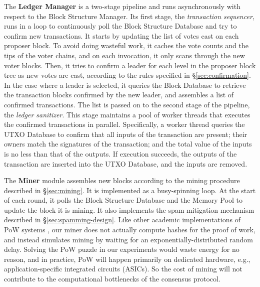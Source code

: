The \textbf{Ledger Manager} is a two-stage pipeline and runs asynchronously with respect to the Block Structure Manager. Its first stage, the \textit{transaction sequencer}, runs in a loop to continuously poll the Block Structure Database and try to confirm new transactions. It starts by updating the list of votes cast on each proposer block. To avoid doing wasteful work, it caches the vote counts and the tips of the voter chains, and on each invocation, it only scans through the new voter blocks. Then, it tries to confirm a leader for each level in the proposer block tree as new votes are cast, according to the rules specified in \S\ref{sec:confirmation}. In the case where a leader is selected, it queries the Block Database to retrieve the transaction blocks confirmed by the new leader, and assembles a list of confirmed transactions. The list is passed on to the second stage of the pipeline, the \textit{ledger sanitizer}. This stage maintains a pool of worker threads that executes the confirmed transactions in parallel. Specifically, a worker thread queries the UTXO Database to confirm that all inputs of the transaction are present; their owners match the signatures of the transaction;
and the total value of the inputs is no less than that of the outputs. If execution succeeds, the outputs of the transaction are inserted into the UTXO Database, and the inputs are removed.

The \textbf{Miner} module assembles new blocks according to the mining procedure described in \S\ref{sec:mining}. It is implemented as a busy-spinning loop. At the start of each round, it polls the Block Structure Database and the Memory Pool to update the block it is mining. It also implements the spam mitigation mechanism described in \S\ref{sec:spamming-design}.
Like other academic implementations of PoW systems \cite{ohie,conflux}, our miner does not actually compute hashes for the proof of work, and instead simulates mining by waiting for an exponentially-distributed random delay. Solving the PoW puzzle in our experiments would waste energy for no reason, and in practice, PoW will happen primarily on dedicated hardware, e.g., application-specific integrated circuits (ASICs). So the cost of mining will not contribute to the computational bottlenecks of the consensus protocol. %

